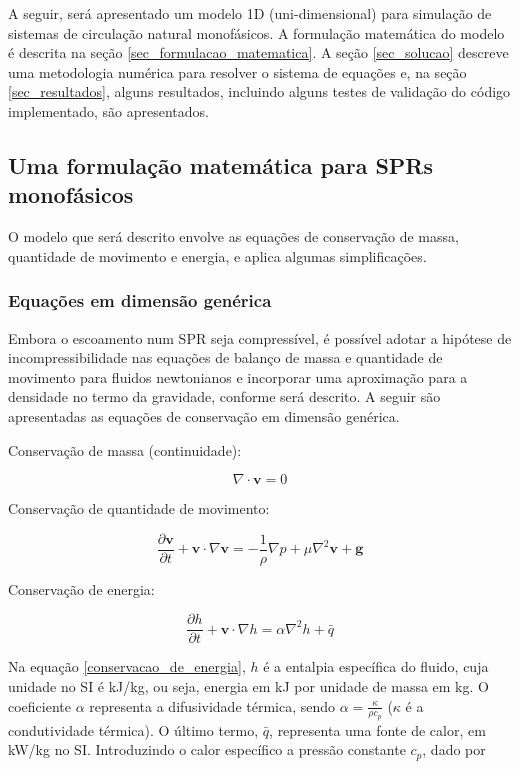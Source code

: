 \documentclass[a4paper,portuguese,10pt]{article}
\renewcommand{\D}{\partial}
\renewcommand{\vec}{\mathbf}
\begin{document}
A seguir, será apresentado um modelo 1D (uni-dimensional) para simulação de sistemas de circulação natural monofásicos. A formulação matemática do modelo é descrita na seção \ref{sec_formulacao_matematica}. A seção \ref{sec_solucao} descreve uma metodologia numérica para resolver o sistema de equações e, na seção \ref{sec_resultados}, alguns resultados, incluindo alguns testes de validação do código implementado, são apresentados.

\subsection{Uma formulação matemática para SPRs monofásicos\label{sec_formulacao_matematica}}

O modelo que será descrito envolve as equações de conservação de massa, quantidade de movimento e energia, e aplica algumas simplificações. 

\subsubsection{Equações em dimensão genérica}

Embora o escoamento num SPR seja compressível, é possível adotar a hipótese de incompressibilidade nas equações de balanço de massa e quantidade de movimento para fluidos newtonianos e incorporar uma aproximação para a densidade no termo da gravidade, conforme será descrito. A seguir são apresentadas as equações de conservação em dimensão genérica.

Conservação de massa (continuidade):

\begin{equation}
  \nabla\cdot\vec{v} = 0
\end{equation}

Conservação de quantidade de movimento:

\begin{equation}
  \frac{\D\vec{v}}{\D t}+\vec{v}\cdot\nabla\vec{v} = -\frac{1}{\rho}\nabla p + \mu\nabla^2\vec{v} + \vec{g}
\end{equation}

Conservação de energia:

\begin{equation}
  \frac{\D h}{\D t}+\vec{v}\cdot\nabla h = \alpha\nabla^2h + \bar{q}
\end{equation}
\label{conservacao_de_energia}

Na equação \ref{conservacao_de_energia}, $h$ é a entalpia específica do fluido, cuja unidade no SI é kJ/kg, ou seja, energia em kJ por unidade de massa em kg. O coeficiente $\alpha$ representa a difusividade térmica, sendo $\alpha = \frac{\kappa}{\rho c_p}$ ($\kappa$ é a condutividade térmica). O último termo, $\bar{q}$, representa uma fonte de calor, em kW/kg no SI. Introduzindo o calor específico a pressão constante $c_p$, dado por
\end{document}
